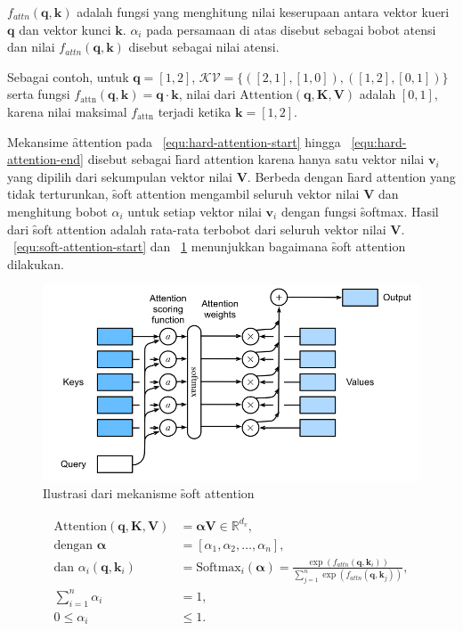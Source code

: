 	$f_{attn}(\mathbf{q}, \mathbf{k})$ adalah fungsi yang menghitung nilai keserupaan antara vektor kueri $\mathbf{q}$ dan vektor kunci $\mathbf{k}$. $\alpha_i$ pada persamaan di atas disebut sebagai bobot atensi dan nilai $f_{attn}(\mathbf{q}, \mathbf{k})$ disebut sebagai nilai atensi.

	Sebagai contoh, untuk $\mathbf{q}= [1,2]$, $\mathcal{KV} = \{([2,1],[1,0]), ([1,2],[0,1])\}$ serta fungsi $f_\text{attn}(\mathbf{q}, \mathbf{k}) =\mathbf{q}\cdot \mathbf{k}$, nilai dari $\text{Attention}( \mathbf{q}, \mathbf{K}, \mathbf{V})$ adalah $[0,1]$, karena nilai maksimal $f_\text{attn}$ terjadi ketika $\mathbf{k} = [1,2]$. 

	Mekansime \f{attention} pada \equ~\ref{equ:hard-attention-start} hingga \equ~\ref{equ:hard-attention-end} disebut sebagai \f{hard attention} karena hanya satu vektor nilai $\mathbf{v}_i$ yang dipilih dari sekumpulan vektor nilai $\mathbf{V}$. Berbeda dengan \f{hard attention} yang tidak terturunkan, \f{soft attention} mengambil seluruh vektor nilai $\mathbf{V}$ dan menghitung bobot $\alpha_i$ untuk setiap vektor nilai $\mathbf{v}_i$ dengan fungsi \f{softmax}. Hasil dari \f{soft attention} adalah rata-rata terbobot dari seluruh vektor nilai $\mathbf{V}$. \equ~\ref{equ:soft-attention-start} dan \pic~\ref{fig:soft-attention} menunjukkan bagaimana \f{soft attention} dilakukan.

	\begin{figure}
		\centering
		\includegraphics[width=1\textwidth]{assets/pics/softattention.png}
		\caption{Ilustrasi dari mekanisme \f{soft attention} \citep{zhang2023dive}}
		\label{fig:soft-attention}
	\end{figure}

	\begin{align}
		\label{equ:soft-attention-start}
		\text{Attention}(\mathbf{q}, \mathbf{K}, \mathbf{V}) &= \mathbf{\alpha}\mathbf{V} \in \mathbb{R}^{d_v},\\
		\text{dengan } \bm{\alpha} &= [\alpha_{1}, \alpha_{2}, \dots, \alpha_{n}], \\
		\text{dan } \alpha_{i}(\mathbf{q},\mathbf{k}_i) &= \text{Softmax}_i(\bm{\alpha}) = \frac{\exp(f_{attn}(\mathbf{q}, \mathbf{k}_i))}{\sum_{j=1}^{n} \exp(f_{attn}(\mathbf{q}, \mathbf{k}_j))}, \\
		\sum_{i=1}^{n} \alpha_{i} &= 1, \\
		\label{equ:soft-attention-end}
		0 \leq \alpha_{i} &\leq 1.
	\end{align}

